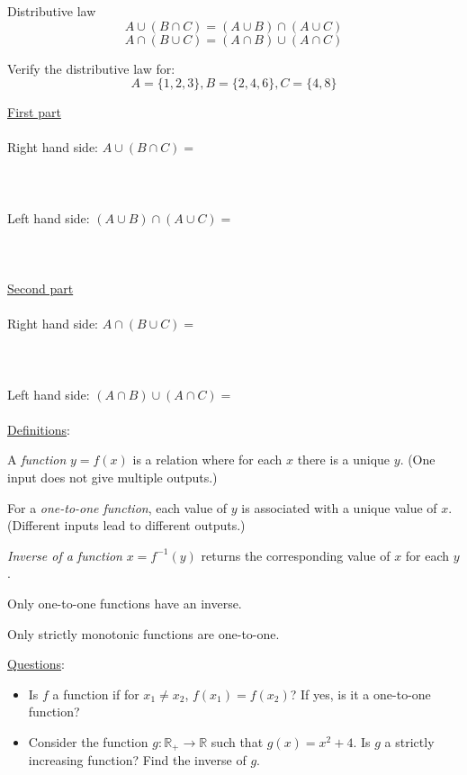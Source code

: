 \documentclass{./../../Latex/handout}
\begin{document}
\thispagestyle{plain}

\vspace{0.5em}
Distributive law
$$ A \cup (B \cap C) = (A \cup B) \cap (A \cup C) $$
$$ A \cap (B \cup C) = (A \cap B) \cup (A \cap C) $$

\vspace{1em}

Verify the distributive law for:
$$ A = \{1,2,3\}, B = \{2,4,6\}, C=\{4,8\} $$

\underline{First part} \\~\\
Right hand side: $ A \cup (B \cap C) = $  \\~\\
\\~\\
Left hand side: $ (A \cup B) \cap (A \cup C) = $ \\~\\
\\~\\
\underline{Second part} \\~\\
Right hand side: $ A \cap (B \cup C) = $  \\~\\
\\~\\
Left hand side: $ (A \cap B) \cup (A \cap C) = $ \\~\\

\newpage
\underline{Definitions}:
\begin{witemize}
	\item A \textit{function} $y=f(x)$ is a relation where for each $x$ there is a unique $y$. (One input does not give multiple outputs.)
	\item For a \textit{one-to-one function}, each value of $y$ is associated with a unique value of $x$. (Different inputs lead to different outputs.)
	\item \textit{Inverse of a function} $x=f^{-1}(y)$ returns the corresponding value of $x$ for each $y$. 
	\item Only one-to-one functions have an inverse.
	\item Only strictly monotonic functions are one-to-one.
\end{witemize}
\vspace{1cm}
\underline{Questions}:
\begin{itemize}
	\item Is $f$ a function if for $ x_1 \neq x_2 $, $f(x_1) = f(x_2)$? If yes, is it a one-to-one function? \\ \vspace{3cm}
	\item Consider the function $g: \mathbb{R}_{+} \rightarrow \mathbb{R}$ such that $g(x) = x^2 + 4 $. Is $g$ a strictly increasing function? Find the inverse of $g$. 
\end{itemize}
\end{document}
